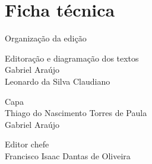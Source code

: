 \chapter{Ficha técnica}

{
\raggedright\small

Organização da edição\\
\hspace{1.5em}\journalorgTitle{} \journalorg{}

\vspace{5mm}

Editoração e diagramação dos textos\\
\hspace{1.5em}Gabriel Araújo\\
\hspace{1.5em}Leonardo da Silva Claudiano

\vspace{5mm}

Capa\\
\hspace{1.5em}Thiago do Nascimento Torres de Paula\\
\hspace{1.5em}Gabriel Araújo

\vspace{5mm}

Editor chefe\\
\hspace{1.5em}Francisco Isaac Dantas de Oliveira

\vspace{5mm}

}
